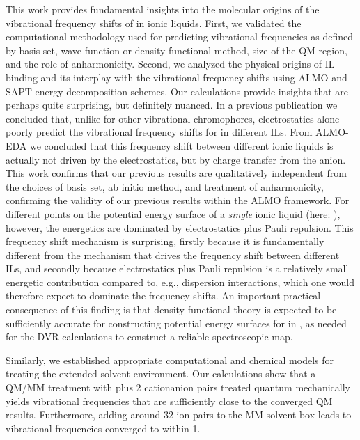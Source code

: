 This work provides fundamental insights into the molecular origins of the vibrational frequency shifts of  in ionic liquids. First, we validated the computational methodology used for predicting vibrational frequencies \textemdash{} as defined by basis set, wave function or density functional method, size of the QM region, and the role of anharmonicity. Second, we analyzed the physical origins of \textendash{}IL binding and its interplay with the vibrational frequency shifts using ALMO and SAPT energy decomposition schemes. Our calculations provide insights that are perhaps quite surprising, but definitely nuanced. In a previous publication we concluded that, unlike for other vibrational chromophores, electrostatics alone poorly predict the vibrational frequency shifts for  in different ILs. From ALMO-EDA we concluded that this frequency shift between different ionic liquids is actually not driven by the electrostatics, but by charge transfer from the anion. This work confirms that our previous results are qualitatively independent from the choices of basis set, ab initio method, and treatment of anharmonicity, confirming the validity of our previous results within the ALMO framework. For different points on the potential energy surface of a \emph{single} ionic liquid (here: \ce{[C4C1im][PF6]}), however, the energetics are dominated by electrostatics plus Pauli repulsion. This frequency shift mechanism is surprising, firstly because it is fundamentally different from the mechanism that drives the  frequency shift between different ILs, and secondly because electrostatics plus Pauli repulsion is a relatively small energetic contribution compared to, e.g., dispersion interactions, which one would therefore expect to dominate the frequency shifts. An important practical consequence of this finding is that density functional theory is expected to be sufficiently accurate for constructing potential energy surfaces for  in \ce{[C4C1im][PF6]}, as needed for the DVR calculations to construct a reliable spectroscopic map.

Similarly, we established appropriate computational and chemical models for treating the extended solvent environment. Our calculations show that a QM/MM treatment with  plus \num{2} cation\textendash{}anion pairs treated quantum mechanically yields vibrational frequencies that are sufficiently close to the converged QM results. Furthermore, adding around \num{32} ion pairs to the MM solvent box leads to vibrational frequencies converged to within \SI{1}{\wavenumber}.

